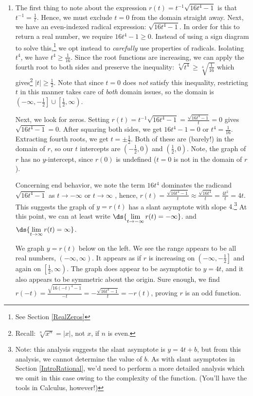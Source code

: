 \documentclass{ximera}
\begin{document}
\begin{example}
\begin{enumerate}
\item  The first thing to note about the expression  $r(t) = t^{-1} \sqrt{16t^4-1}$ is that $t^{-1} = \frac{1}{t}$.  Hence, we must exclude $t=0$ from the domain straight away. Next, we have an even-indexed radical expression: $\sqrt{16t^4-1}$.  In order for this to return a real number, we require  $16t^4-1 \geq 0$.  Instead of using a sign diagram to solve this,\footnote{See Section \ref{RealZeros}} we opt instead to  \textit{carefully} use properties of radicals.  Isolating $t^4$, we have $t^4 \geq \frac{1}{16}$.  Since the root functions are increasing, we can apply the fourth root to both sides and preserve the inequality:  $\sqrt[4]{t^4} \geq \sqrt[4]{\frac{1}{16}}$ which gives\footnote{Recall: $\sqrt[n]{x^n} = |x|$, not $x$,  if $n$ is even.} $|t| \geq \frac{1}{2}$. Note that since $t =0$ does \textit{not} satisfy this inequality, restricting $t$ in this manner takes care of  \textit{both} domain issues, so the domain is  $\left(-\infty, -\frac{1}{2} \right] \cup \left[\frac{1}{2}, \infty \right)$.   

Next, we look for zeros.  Setting $r(t) = t^{-1} \sqrt{16t^4-1} = \frac{\sqrt{16t^4-1}}{t}=0$ gives $\sqrt{16t^4-1} = 0$.  After squaring both sides, we get $16t^4-1 = 0$ or $t^4 = \frac{1}{16}$.  Extracting fourth roots, we get $t = \pm \frac{1}{2}$. Both of these are (barely!) in the domain of $r$, so our $t$ intercepts are $\left( -\frac{1}{2}, 0\right)$ and $\left( \frac{1}{2}, 0\right)$.  Note, the graph of $r$ has no $y$-intercept, since $r(0)$ is undefined ($t=0$ is not in the domain of $r$).  

Concerning end behavior, we note the term $16t^4$ dominates the radicand $\sqrt{16t^4-1}$ as $t \rightarrow - \infty$ or $t \rightarrow \infty$ ,  hence, $r(t) = \frac{\sqrt{16t^4-1}}{t} \approx \frac{\sqrt{16t^4}}{t} = \frac{4t^2}{t} = 4t$.  This suggests the graph of $y = r(t)$ has a slant asymptote with slope $4$.\footnote{Note: this analysis suggests the slant asymptote is $y = 4t+b$, but from this analysis, we cannot determine the value of $b$.  As with slant asymptotes in Section \ref{IntroRational}, we'd need to perform a more detailed analysis which we omit in this case owing to the complexity of the function. (You'll have the tools in Calculus, however!)}  At this point, we can at least write $\ds{\lim_{t \rightarrow -\infty} r(t) = -\infty}$. and $\ds{\lim_{t \rightarrow \infty} r(t) = \infty}$.

We graph $y=r(t)$ below on the left.  We see the range appears to be all real numbers, $(-\infty, \infty)$.  It appears as if $r$ is increasing on $\left(-\infty, -\frac{1}{2} \right]$ and again on $\left[\frac{1}{2}, \infty \right)$.  The graph does appear to be asymptotic to $y = 4t$, and it also appears to be symmetric about the origin.  Sure enough, we find  $r(-t) = \frac{\sqrt{16(-t)^4-1}}{-t}  = - \frac{\sqrt{16t^4-1}}{t} = -r(t)$, proving $r$ is an odd function.


\end{enumerate}
\end{example}
\end{document}
